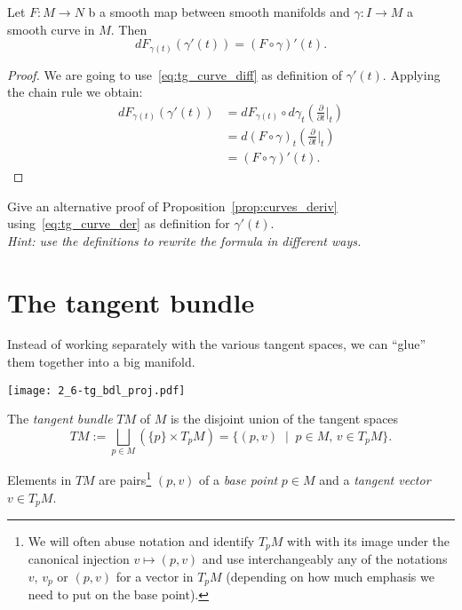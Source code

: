 \begin{proposition}\label{prop:curves_deriv}
  Let $F:M\to N$ b a smooth map between smooth manifolds and $\gamma:I\to M$ a smooth curve in $M$.
  Then
  \begin{equation}
    d F_{\gamma(t)} (\gamma'(t)) = (F\circ\gamma)'(t).
  \end{equation}
\end{proposition}
\begin{proof}
  We are going to use~\eqref{eq:tg_curve_diff} as definition of $\gamma'(t)$.
  Applying the chain rule we obtain:
  \begin{align}
    d F_{\gamma(t)} (\gamma'(t))
    &= d F_{\gamma(t)} \circ d\gamma_t\left(\frac{\partial}{\partial t}\Big|_t\right) \\
    &= d (F\circ\gamma)_t \left(\frac{\partial}{\partial t}\Big|_t\right) \\
    &= (F\circ\gamma)'(t).
  \end{align}
\end{proof}

\begin{exercise}
  Give an alternative proof of Proposition~\ref{prop:curves_deriv} using~\eqref{eq:tg_curve_der} as definition for $\gamma'(t)$.\\
 \textit{\small Hint: use the definitions to rewrite the formula in different ways.}
\end{exercise}

\section{The tangent bundle}\label{sec:tangentbundle}

Instead of working separately with the various tangent spaces, we can ``glue'' them together into a big manifold.

\begin{marginfigure}
  \texttt{[image: 2\_6-tg\_bdl\_proj.pdf]}
\end{marginfigure}
\begin{definition}
  The \emph{tangent bundle} $TM$ of $M$ is the disjoint union of the tangent spaces
  \begin{equation}
    TM := \bigsqcup_{p\in M}\left(\{p\}\times T_pM\right)
       = \{(p,v) \;\mid\; p\in M,\, v\in T_pM\}.
  \end{equation}  
\end{definition}

Elements in $TM$ are pairs\footnote{We will often abuse notation and identify $T_pM$ with with its image under the canonical injection $v\mapsto(p,v)$ and use interchangeably any of the notations $v$, $v_p$ or $(p,v)$ for a vector in $T_pM$ (depending on how much emphasis we need to put on the base point).} $(p,v)$ of a \emph{base point} $p\in M$ and a \emph{tangent vector} $v\in T_pM$.

